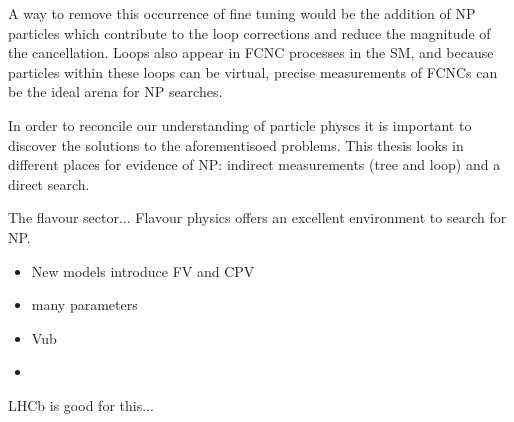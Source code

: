 A way to remove this occurrence of fine tuning would be the addition of NP particles which
contribute to the loop corrections and reduce the magnitude of the cancellation.
Loops also appear in FCNC processes in the SM, and because particles within these loops can be
virtual, precise measurements of FCNCs can be the ideal arena for NP searches.


In order to reconcile our understanding of particle physcs it is important to discover the
solutions to the aforementisoed problems.
This thesis looks in different places for evidence of NP: indirect measurements (tree and loop) and
a direct search.



The flavour sector...
Flavour physics offers an excellent environment to search for NP.

\begin{itemize}
  \item New models introduce FV and CPV
  \item many parameters
  \item Vub
  \item
\end{itemize}

LHCb is good for this...


%




